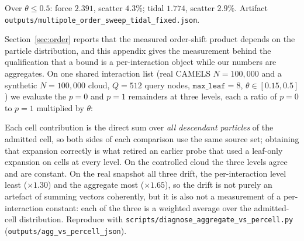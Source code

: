 \begin{center}
\end{center}

\noindent Over $\theta\le0.5$: force $2.391$, scatter $4.3\%$; tidal $1.774$, scatter $2.9\%$.
Artifact \texttt{outputs/\allowbreak multipole\_order\_sweep\_\allowbreak tidal\_fixed.\allowbreak json}.

Section~\ref{sec:order} reports that the measured order-shift product depends on the particle
distribution, and this appendix gives the measurement behind the qualification that a bound is a
per-interaction object while our numbers are aggregates. On one shared interaction list (real
CAMELS $N=100{,}000$ and a synthetic $N=100{,}000$ cloud, $Q=512$ query nodes, $\texttt{max\_leaf}=8$,
$\theta\in[0.15,0.5]$) we evaluate the $p{=}0$ and $p{=}1$ remainders at three levels, each a ratio
of $p{=}0$ to $p{=}1$ multiplied by $\theta$:

\begin{center}
\end{center}

\noindent Each cell contribution is the direct sum over \emph{all descendant particles} of the
admitted cell, so both sides of each comparison use the same source set; obtaining that expansion
correctly is what retired an earlier probe that used a leaf-only expansion on cells at every level.
On the controlled cloud the three levels agree and are constant. On the real snapshot all three
drift, the per-interaction level least ($\times1.30$) and the aggregate most ($\times1.65$), so the
drift is not purely an artefact of summing vectors coherently, but it is also not a measurement of a
per-interaction constant: each of the three is a weighted average over the admitted-cell
distribution. Reproduce with \texttt{scripts/\allowbreak diagnose\_\allowbreak aggregate\_\allowbreak vs\_\allowbreak percell.\allowbreak py}
(\texttt{outputs/\allowbreak agg\_\allowbreak vs\_\allowbreak percell\_\allowbreak *\.\allowbreak json}).

